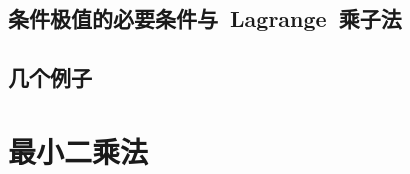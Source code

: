 \subsection{条件极值的必要条件与~Lagrange~乘子法}
\subsection{几个例子}
\begin{exercise}

\end{exercise}
\section{最小二乘法}
\begin{exercise}

\end{exercise}
\begin{exercise*}

\end{exercise*}




\endinput
